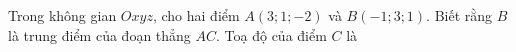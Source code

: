 \begin{ex}
Trong không gian $Oxyz$, cho hai điểm $A(3;1;-2)$ và $B(-1;3;1)$. Biết rằng $B$ là trung điểm của đoạn thẳng $AC$. Toạ độ của điểm $C$ là
\end{ex}
